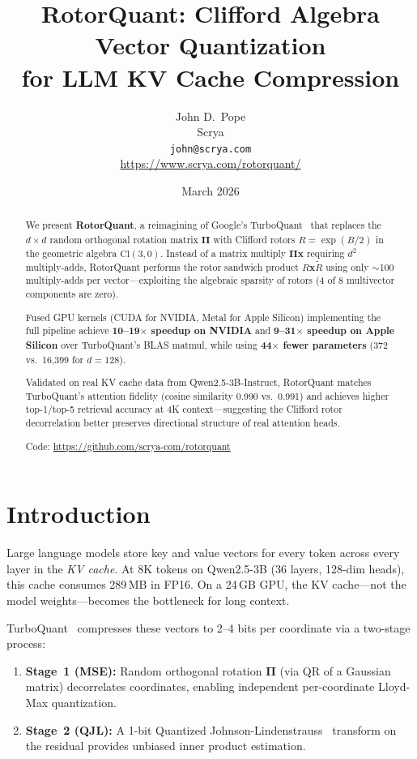 \documentclass[10pt,twocolumn]{article}
\title{\textbf{RotorQuant: Clifford Algebra Vector Quantization\\for LLM KV Cache Compression}}
\author{
  John D.\ Pope\\
  Scrya\\
  \texttt{john@scrya.com}\\
  \url{https://www.scrya.com/rotorquant/}
}
\date{March 2026}
\begin{document}
\maketitle

\begin{abstract}
We present \textbf{RotorQuant}, a reimagining of Google's TurboQuant~\cite{turboquant} that replaces the $d \times d$ random orthogonal rotation matrix $\mathbf{\Pi}$ with Clifford rotors $R = \exp(B/2)$ in the geometric algebra $\mathrm{Cl}(3,0)$.
Instead of a matrix multiply $\mathbf{\Pi x}$ requiring $d^2$ multiply-adds, RotorQuant performs the rotor sandwich product $R\mathbf{x}\tilde{R}$ using only $\sim$100 multiply-adds per vector---exploiting the algebraic sparsity of rotors (4 of 8 multivector components are zero).

Fused GPU kernels (CUDA for NVIDIA, Metal for Apple Silicon) implementing the full pipeline achieve \textbf{10--19$\times$ speedup on NVIDIA} and \textbf{9--31$\times$ speedup on Apple Silicon} over TurboQuant's BLAS matmul, while using \textbf{44$\times$ fewer parameters} (372 vs.\ 16,399 for $d=128$).

Validated on real KV cache data from Qwen2.5-3B-Instruct, RotorQuant matches TurboQuant's attention fidelity (cosine similarity 0.990 vs.\ 0.991) and achieves higher top-1/top-5 retrieval accuracy at 4K context---suggesting the Clifford rotor decorrelation better preserves directional structure of real attention heads.

Code: \url{https://github.com/scrya-com/rotorquant}
\end{abstract}

\section{Introduction}
\label{sec:intro}

Large language models store key and value vectors for every token across every layer in the \emph{KV cache}.
At 8K tokens on Qwen2.5-3B (36 layers, 128-dim heads), this cache consumes 289\,MB in FP16.
On a 24\,GB GPU, the KV cache---not the model weights---becomes the bottleneck for long context.

TurboQuant~\cite{turboquant} compresses these vectors to 2--4 bits per coordinate via a two-stage process:
\begin{enumerate}[nosep]
  \item \textbf{Stage~1 (MSE):} Random orthogonal rotation $\mathbf{\Pi}$ (via QR of a Gaussian matrix) decorrelates coordinates, enabling independent per-coordinate Lloyd-Max quantization.
  \item \textbf{Stage~2 (QJL):} A 1-bit Quantized Johnson-Lindenstrauss~\cite{qjl} transform on the residual provides unbiased inner product estimation.
\end{enumerate}
\end{document}

